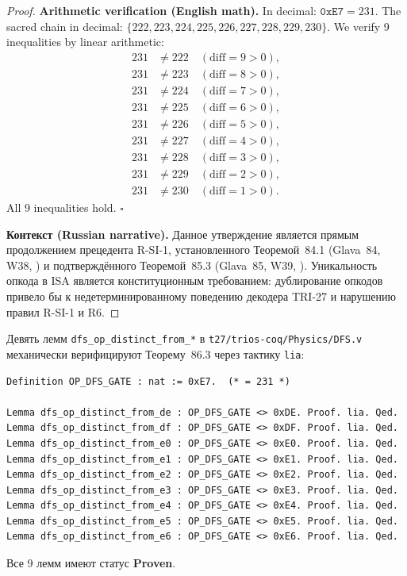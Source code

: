 \begin{proof}
\textbf{Arithmetic verification (English math).}
In decimal: $\texttt{0xE7} = 231$.
The sacred chain in decimal: $\{222, 223, 224, 225, 226, 227, 228, 229, 230\}$.
We verify 9 inequalities by linear arithmetic:
\begin{align*}
  231 &\neq 222 \quad (\text{diff}=9>0),  \\
  231 &\neq 223 \quad (\text{diff}=8>0),  \\
  231 &\neq 224 \quad (\text{diff}=7>0),  \\
  231 &\neq 225 \quad (\text{diff}=6>0),  \\
  231 &\neq 226 \quad (\text{diff}=5>0),  \\
  231 &\neq 227 \quad (\text{diff}=4>0),  \\
  231 &\neq 228 \quad (\text{diff}=3>0),  \\
  231 &\neq 229 \quad (\text{diff}=2>0),  \\
  231 &\neq 230 \quad (\text{diff}=1>0).
\end{align*}
All 9 inequalities hold.
\hfill\ensuremath{\square}

\textbf{Контекст (Russian narrative).}
Данное утверждение является прямым продолжением прецедента R-SI-1,
установленного Теоремой~84.1 (Glava~84, W38, \cite{trios884}) и
подтверждённого Теоремой~85.3 (Glava~85, W39, \cite{trios891}).
Уникальность опкода в ISA является конституционным требованием:
дублирование опкодов привело бы к недетерминированному поведению
декодера TRI-27 и нарушению правил R-SI-1 и R6.
\end{proof}

\begin{remark}
\label{rem:coq-op-distinct}
Девять лемм \texttt{dfs\_op\_distinct\_from\_*} в
\texttt{t27/trios-coq/Physics/DFS.v} механически верифицируют
Теорему~86.3 через тактику \texttt{lia}:
\begin{verbatim}
Definition OP_DFS_GATE : nat := 0xE7.  (* = 231 *)

Lemma dfs_op_distinct_from_de : OP_DFS_GATE <> 0xDE. Proof. lia. Qed.
Lemma dfs_op_distinct_from_df : OP_DFS_GATE <> 0xDF. Proof. lia. Qed.
Lemma dfs_op_distinct_from_e0 : OP_DFS_GATE <> 0xE0. Proof. lia. Qed.
Lemma dfs_op_distinct_from_e1 : OP_DFS_GATE <> 0xE1. Proof. lia. Qed.
Lemma dfs_op_distinct_from_e2 : OP_DFS_GATE <> 0xE2. Proof. lia. Qed.
Lemma dfs_op_distinct_from_e3 : OP_DFS_GATE <> 0xE3. Proof. lia. Qed.
Lemma dfs_op_distinct_from_e4 : OP_DFS_GATE <> 0xE4. Proof. lia. Qed.
Lemma dfs_op_distinct_from_e5 : OP_DFS_GATE <> 0xE5. Proof. lia. Qed.
Lemma dfs_op_distinct_from_e6 : OP_DFS_GATE <> 0xE6. Proof. lia. Qed.
\end{verbatim}
Все 9 лемм имеют статус \textbf{Proven}.
\end{remark}

